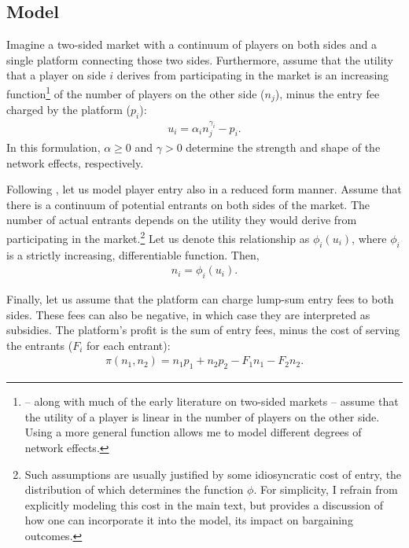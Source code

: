 \documentclass[a4paper]{article}
\begin{document}
\subsection{Model}

Imagine a two-sided market with a continuum of players on both sides and a single platform connecting those two sides.
Furthermore, assume that the utility that a player on side $i$ derives from participating in the market is an increasing function\footnote{
    \textcite{armstrong2006competition} -- along with much of the early literature on two-sided markets \parencite[e.g.][]{rochet2003platform,hagiu2006pricing} -- assume that the utility of a player is linear in the number of players on the other side.
    Using a more general function allows me to model different degrees of network effects.
} of the number of players on the other side ($n_j$), minus the entry fee charged by the platform ($p_i$):
\begin{align*}
    u_i = \alpha_i n_j ^ {\gamma_i} - p_i.
\end{align*}
In this formulation, $\alpha \geq 0$ and $\gamma > 0$ determine the strength and shape of the network effects, respectively.

Following \textcite{armstrong2006competition}, let us model player entry also in a reduced form manner.
Assume that there is a continuum of potential entrants on both sides of the market.
The number of actual entrants depends on the utility they would derive from participating in the market.\footnote{
    Such assumptions are usually justified by some idiosyncratic cost of entry, the distribution of which determines the function $\phi$.
    For simplicity, I refrain from explicitly modeling this cost in the main text, but  provides a discussion of how one can incorporate it into the model, its impact on bargaining outcomes.
}
Let us denote this relationship as $\phi_i(u_i)$, where $\phi_i$ is a strictly increasing, differentiable function.
Then,
\begin{align*}
    n_i = \phi_i(u_i).
\end{align*}

Finally, let us assume that the platform can charge lump-sum entry fees to both sides.
These fees can also be negative, in which case they are interpreted as subsidies.
The platform's profit is the sum of entry fees, minus the cost of serving the entrants ($F_i$ for each entrant):
\begin{align*}
    \pi(n_1, n_2) = n_1 p_1 + n_2 p_2 - F_1 n_1 - F_2 n_2.
\end{align*}
\end{document}

